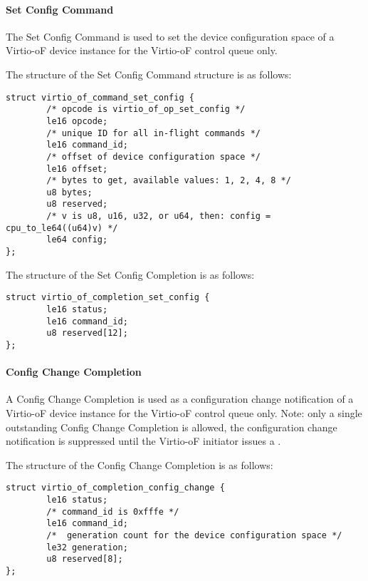 \paragraph{Set Config Command}\label{sec:Virtio Transport Options / Virtio Over Fabrics / Commands Definition / Opcodes / Set Config Command}
The Set Config Command is used to set the device configuration space of a Virtio-oF device instance for the Virtio-oF control queue only.

The structure of the Set Config Command structure is as follows:
\begin{lstlisting}
struct virtio_of_command_set_config {
        /* opcode is virtio_of_op_set_config */
        le16 opcode;
        /* unique ID for all in-flight commands */
        le16 command_id;
        /* offset of device configuration space */
        le16 offset;
        /* bytes to get, available values: 1, 2, 4, 8 */
        u8 bytes;
        u8 reserved;
        /* v is u8, u16, u32, or u64, then: config = cpu_to_le64((u64)v) */
        le64 config;
};
\end{lstlisting}

The structure of the Set Config Completion is as follows:
\begin{lstlisting}
struct virtio_of_completion_set_config {
        le16 status;
        le16 command_id;
        u8 reserved[12];
};
\end{lstlisting}

\paragraph{Config Change Completion}\label{sec:Virtio Transport Options / Virtio Over Fabrics / Commands Definition / Opcodes / Config Change Completion}
A Config Change Completion is used as a configuration change notification of a Virtio-oF device instance for the Virtio-oF control queue only.
Note: only a single outstanding Config Change Completion is allowed, the configuration change notification is suppressed until the Virtio-oF initiator issues a
.

The structure of the Config Change Completion is as follows:
\begin{lstlisting}
struct virtio_of_completion_config_change {
        le16 status;
        /* command_id is 0xfffe */
        le16 command_id;
        /*  generation count for the device configuration space */
        le32 generation;
        u8 reserved[8];
};
\end{lstlisting}

